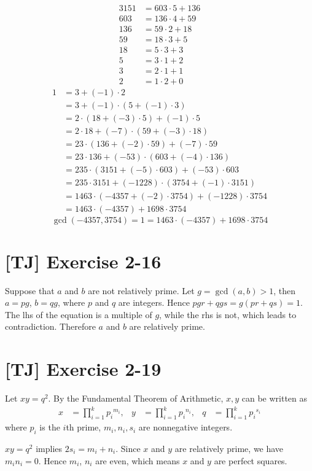 \documentclass[a4paper,11pt,twocolumn]{article}
\begin{document}
\begin{enumerate}[(a)]
\begin{align*}
          3151 &= 603 \cdot 5 + 136 \\
          603 &= 136 \cdot 4 + 59 \\
          136 &= 59 \cdot 2 + 18 \\
          59 &= 18 \cdot 3 + 5 \\
          18 &= 5 \cdot 3 + 3 \\
          5 &= 3 \cdot 1 + 2 \\
          3 &= 2 \cdot 1 + 1 \\
          2 &= 1 \cdot 2 + 0
        \end{align*}
        \begin{align*}
          1 &= 3 + (-1) \cdot 2 \\
            &= 3 + (-1) \cdot (5 + (-1) \cdot 3) \\
            &= 2 \cdot (18 + (-3) \cdot 5) + (-1) \cdot 5 \\
            &= 2 \cdot 18 + (-7) \cdot (59 + (-3) \cdot 18) \\
            &= 23 \cdot (136 + (-2) \cdot 59) + (-7) \cdot 59 \\
            &= 23 \cdot 136 + (-53) \cdot (603 + (-4) \cdot 136) \\
            &= 235 \cdot (3151 + (-5) \cdot 603) + (-53) \cdot 603 \\
            &= 235 \cdot 3151 + (-1228) \cdot (3754 + (-1) \cdot 3151) \\
            &= 1463 \cdot (-4357 + (-2) \cdot 3754) + (-1228) \cdot 3754 \\
            &= 1463 \cdot (-4357) + 1698 \cdot 3754
        \end{align*}
        $$ \gcd(-4357, 3754) = 1 = 1463 \cdot (-4357) + 1698 \cdot 3754 $$
  \end{enumerate}
  
  \section{[TJ] Exercise 2-16}
  Suppose that $a$ and $b$ are not relatively prime. Let $g = \gcd(a, b) > 1$, then $a = pg$, $b = qg$, where $p$ and $q$ are integers. Hence $pgr + qgs = g(pr + qs) = 1$. The lhs of the equation is a multiple of $g$, while the rhs is not, which leads to contradiction. Therefore $a$ and $b$ are relatively prime.

  \section{[TJ] Exercise 2-19}
  Let $xy = q^2$. By the Fundamental Theorem of Arithmetic, $x, y$ can be written as 
  \begin{align*}
    x &= \prod_{i=1}^{k} {p_i}^{m_i},  &  y &= \prod_{i=1}^{k} {p_i}^{n_i}, & q &= \prod_{i=1}^{k} {p_i}^{s_i}
  \end{align*}
  where $p_i$ is the $i$th prime, $m_i, n_i, s_i$ are nonnegative integers. \par
  $xy = q^2$ implies $2s_i = m_i + n_i$. Since $x$ and $y$ are relatively prime, we have $m_i n_i = 0$. Hence $m_i$, $n_i$ are even, which means $x$ and $y$ are perfect squares.
\end{document}

